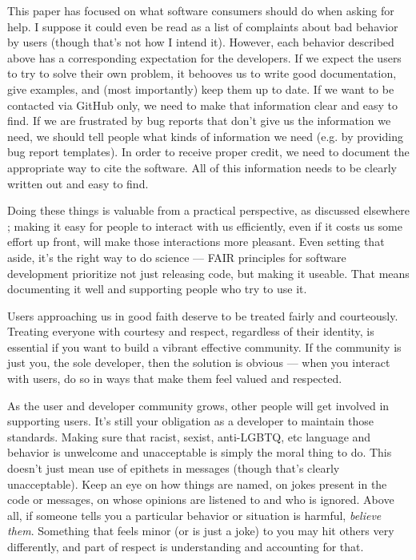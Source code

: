\documentclass[9pt,training,pubversion]{livecoms}
\begin{document}
This paper has focused on what software consumers should do when asking for
help.  I suppose it could even be read as a list of complaints about bad
behavior by users (though that's not how I intend it). However, each behavior
described above has a corresponding expectation for the developers. If we expect
the users to try to solve their own problem, it behooves us to write good
documentation, give examples, and (most importantly) keep them up to date. If we
want to be contacted via GitHub only, we need to make that information clear and
easy to find. If we are frustrated by bug reports that don't give us the
information we need, we should tell people what kinds of information we need
(e.g. by providing bug report templates). In order to receive proper credit, we
need to document the appropriate way to cite the software. All of this
information needs to be clearly written out and easy to find.

Doing these things is valuable from a practical perspective, as discussed
elsewhere \cite{Heister-2013, Laayouni-2016, Wallqvist-2019}; making it easy for
people to interact with us efficiently, even if it costs us some effort up
front, will make those interactions more pleasant. Even setting that aside, it's
the right way to do science --- FAIR principles for software development
\cite{Lamprecht-2020} prioritize not just releasing code, but making it useable.
That means documenting it well and supporting people who try to use it.

Users approaching us in good faith deserve to be treated fairly and courteously.
Treating everyone with courtesy and respect, regardless of their identity, is
essential if you want to build a vibrant effective community.  If the community
is just you, the sole developer, then the solution is obvious --- when you
interact with users, do so in ways that make them feel valued and respected.

As the user and developer community grows, other people will get involved in
supporting users. It's still your obligation as a developer to maintain those
standards.  Making sure that racist, sexist, anti-LGBTQ, etc language and
behavior is unwelcome and unacceptable is simply the moral thing to do.  This
doesn't just mean use of epithets in messages (though that's clearly
unacceptable). Keep an eye on how things are named, on jokes present in the code
or messages, on whose opinions are listened to and who is ignored.  Above all,
if someone tells you a particular behavior or situation is harmful,
\emph{believe them}.  Something that feels minor (or is just a joke) to you may
hit others very differently, and part of respect is understanding and accounting
for that.
\end{document}

